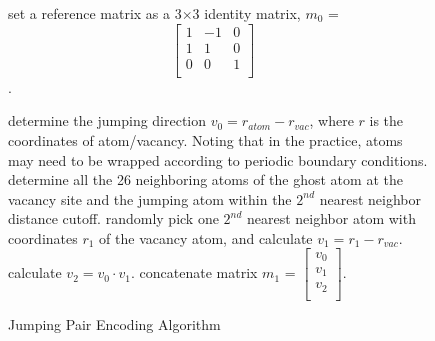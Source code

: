 \begin{figure}[!htb]
  \centering
  \begin{minipage}{.7\linewidth}
    \begin{algorithm}[H]
      \caption{Jumping Pair Encoding Algorithm}\label{algo:encode}
      \begin{algorithmic}[1]
        \State set a reference matrix as a 3$\times$3 identity matrix, $m_0$ = $$\begin{bmatrix} 1 & -1 & 0 \\1 & 1 & 0 \\0 & 0 & 1 \\\end{bmatrix}\quad$$.
        
        \State determine the jumping direction $v_0 = r_{atom} - r_{vac}$, where $r$ is the coordinates of atom/vacancy. Noting that in the practice, atoms may need to be wrapped according to periodic boundary conditions.
        \State determine all the 26 neighboring atoms of the ghost atom at the vacancy site and the jumping atom within the $2^{nd}$ nearest neighbor distance cutoff.
        \State randomly pick one $2^{nd}$ nearest neighbor atom with coordinates $r_1$ of the vacancy atom, and calculate $v_1 = r_{1} - r_{vac}$.
        \State calculate $v_2 = v_0 \cdot v_1$.
        \State concatenate matrix $m_1$ = $\begin{bmatrix} v_0 \\v_1 \\v_2 \\\end{bmatrix}$.
        

\end{algorithmic}
\end{algorithm}
\end{minipage}
\end{figure}
